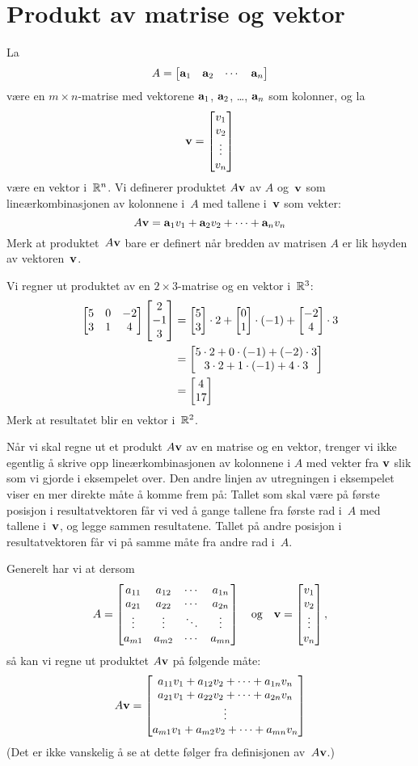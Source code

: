 \section*{Produkt av matrise og vektor}

La
\[
A =
\begin{bmatrix}
\mathbf{a}_1 & \mathbf{a}_2 & \cdots & \mathbf{a}_n
\end{bmatrix}
\]
være en $m \times n$-matrise med vektorene $\mathbf{a}_1$, $\mathbf{a}_2$,
\ldots, $\mathbf{a}_n$ som kolonner, og la
\[
\mathbf{v} = \begin{bmatrix} v_1 \\ v_2 \\ \vdots \\ v_n \end{bmatrix}
\]
være en vektor i~$\mathbb{R}^n$.  Vi definerer produktet $A\mathbf{v}$ av $A$
og~$\mathbf{v}$ som lineærkombinasjonen av kolonnene i~$A$ med tallene
i~$\mathbf{v}$ som vekter:
\[
A \mathbf{v} = \mathbf{a}_1 v_1 + \mathbf{a}_2 v_2 + \cdots + \mathbf{a}_n v_n
\]
Merk at produktet~$A \mathbf{v}$ bare er definert når bredden av matrisen
$A$ er lik høyden av vektoren~$\mathbf{v}$.

\begin{ex}
\label{ex:Av}
Vi regner ut produktet av en $2 \times 3$-matrise og en vektor
i~$\mathbb{R}^3$:
\begin{align*}
\begin{bmatrix}
5 & 0 & -2 \\
3 & 1 &  4
\end{bmatrix}
\begin{bmatrix} 2 \\ -1 \\ 3 \end{bmatrix}
&=
\begin{bmatrix} 5 \\ 3 \end{bmatrix} \cdot 2 +
\begin{bmatrix} 0 \\ 1 \end{bmatrix} \cdot (-1) +
\begin{bmatrix} -2 \\ 4 \end{bmatrix} \cdot 3
\\
&= \begin{bmatrix} 5 \cdot 2 + 0 \cdot (-1) + (-2) \cdot 3 \\ 3 \cdot 2 + 1 \cdot (-1) +   4  \cdot 3 \end{bmatrix}
\\
&= \begin{bmatrix} 4 \\ 17 \end{bmatrix}
\end{align*}
Merk at resultatet blir en vektor i~$\mathbb{R}^2$.
\end{ex}

Når vi skal regne ut et produkt $A \mathbf{v}$ av en matrise og en vektor,
trenger vi ikke egentlig å skrive opp lineærkombinasjonen av kolonnene
i $A$ med vekter fra $\mathbf{v}$ slik som vi gjorde i eksempelet over.
Den andre linjen av utregningen i eksempelet viser en mer direkte måte
å komme frem på: Tallet som skal være på første posisjon i
resultatvektoren får vi ved å gange tallene fra første rad i~$A$ med
tallene i~$\mathbf{v}$, og legge sammen resultatene.  Tallet på andre
posisjon i resultatvektoren får vi på samme måte fra andre rad i~$A$.

Generelt har vi at dersom
\[
A =
\begin{bmatrix}
a_{11} & a_{12} & \cdots & a_{1n} \\
a_{21} & a_{22} & \cdots & a_{2n} \\
\vdots & \vdots & \ddots & \vdots \\
a_{m1} & a_{m2} & \cdots & a_{mn}
\end{bmatrix}
\quad\text{og}\quad
\mathbf{v} = \begin{bmatrix} v_1 \\ v_2 \\ \vdots \\ v_n \end{bmatrix},
\]
så kan vi regne ut produktet $A \mathbf{v}$ på følgende måte:
\[
A \mathbf{v} =
\begin{bmatrix} a_{11} v_1 + a_{12} v_2 + \cdots + a_{1n} v_n \\ a_{21} v_1 + a_{22} v_2 + \cdots + a_{2n} v_n \\ \vdots \\ a_{m1} v_1 + a_{m2} v_2 + \cdots + a_{mn} v_n \end{bmatrix}
\]
(Det er ikke vanskelig å se at dette følger fra definisjonen
av~$A \mathbf{v}$.)



